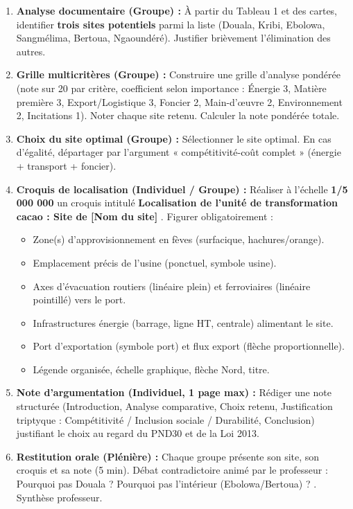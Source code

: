 \documentclass[11pt]{article}
\newcommand{\cle}[1]{{\popxbold\color{popdark}#1}}
\newcounter{popsec}
\newcounter{popsub}
\newcommand{\courssub}[1]{%
  \stepcounter{popsub}%
  \par\vspace{9pt}\noindent{\popxbold\fontsize{11.5}{13}\selectfont\color{popink}{\color{poporange}\thepopsec.\thepopsub}\hspace{6pt}#1}\par\nopagebreak\vspace{4pt}
}
\begin{document}
\courssub{Consignes}
\begin{enumerate}
    \item \textbf{Analyse documentaire (Groupe) :} À partir du Tableau 1 et des cartes, identifier \textbf{trois sites potentiels} parmi la liste (Douala, Kribi, Ebolowa, Sangmélima, Bertoua, Ngaoundéré). Justifier brièvement l'élimination des autres.
    \item \textbf{Grille multicritères (Groupe) :} Construire une grille d'analyse pondérée (note sur 20 par critère, coefficient selon importance : Énergie 3, Matière première 3, Export/Logistique 3, Foncier 2, Main-d'œuvre 2, Environnement 2, Incitations 1). Noter chaque site retenu. Calculer la note pondérée totale.
    \item \textbf{Choix du site optimal (Groupe) :} Sélectionner le site optimal. En cas d'égalité, départager par l'argument « \cle{compétitivité-coût complet} » (énergie + transport + foncier).
    \item \textbf{Croquis de localisation (Individuel / Groupe) :} Réaliser à l'échelle \textbf{1/5 000 000} un croquis intitulé \og \textbf{Localisation de l'unité de transformation cacao : Site de [Nom du site]} \fg. Figurer obligatoirement :
        \begin{itemize}
            \item Zone(s) d'approvisionnement en fèves (surfacique, hachures/orange).
            \item Emplacement précis de l'usine (ponctuel, symbole usine).
            \item Axes d'évacuation routiers (linéaire plein) et ferroviaires (linéaire pointillé) vers le port.
            \item Infrastructures énergie (barrage, ligne HT, centrale) alimentant le site.
            \item Port d'exportation (symbole port) et flux export (flèche proportionnelle).
            \item Légende organisée, échelle graphique, flèche Nord, titre.
        \end{itemize}
    \item \textbf{Note d'argumentation (Individuel, 1 page max) :} Rédiger une note structurée (Introduction, Analyse comparative, Choix retenu, Justification triptyque : Compétitivité / Inclusion sociale / Durabilité, Conclusion) justifiant le choix au regard du \cle{PND30} et de la \cle{Loi 2013}.
    \item \textbf{Restitution orale (Plénière) :} Chaque groupe présente son site, son croquis et sa note (5 min). Débat contradictoire animé par le professeur : \og Pourquoi pas Douala ? Pourquoi pas l'intérieur (Ebolowa/Bertoua) ? \fg. Synthèse professeur.
\end{enumerate}
\end{document}
